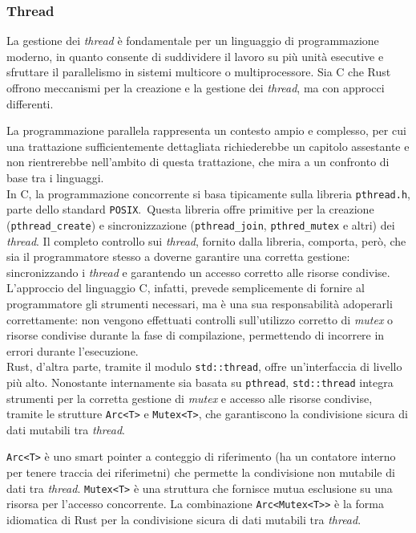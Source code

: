 \subsubsection{Thread}
La gestione dei \textit{thread} è fondamentale per un linguaggio di programmazione moderno, in quanto consente di suddividere il lavoro su più unità esecutive e sfruttare
il parallelismo in sistemi multicore o multiprocessore. 
Sia C che Rust
offrono meccanismi per la creazione e la gestione dei \textit{thread}, ma con approcci differenti. 

La programmazione parallela rappresenta un contesto ampio e complesso, per cui una 
trattazione sufficientemente dettagliata richiederebbe un capitolo assestante e non rientrerebbe nell'ambito di questa trattazione, che mira a un confronto di base tra i linguaggi. \hfill
\vspace{10pt}\\
\noindent In C, la programmazione concorrente si basa tipicamente sulla libreria \texttt{pthread.h}, parte dello standard \texttt{POSIX}.\ 
Questa libreria offre primitive per la creazione (\texttt{pthread\_create}) e sincronizzazione (\texttt{pthread\_join}, \texttt{pthred\_mutex} e altri) dei \textit{thread}.
Il completo controllo sui \textit{thread}, fornito dalla libreria, comporta, però, che sia il programmatore stesso a doverne garantire una corretta gestione: sincronizzando i \textit{thread} e
garantendo un accesso corretto alle risorse condivise. 
L'approccio del linguaggio C, infatti, prevede semplicemente di fornire al programmatore gli strumenti
necessari, ma è una sua responsabilità adoperarli correttamente: non vengono effettuati controlli sull'utilizzo corretto di \textit{mutex} o risorse condivise durante la fase 
di compilazione, permettendo di incorrere in errori durante l'esecuzione. \hfill
\vspace{10pt}\\
\noindent Rust, d'altra parte, tramite il modulo \texttt{std::thread}, offre un'interfaccia di livello più alto. 
Nonostante internamente sia basata su \texttt{pthread}, \texttt{std::thread} integra strumenti per la corretta gestione di \textit{mutex} e accesso alle risorse condivise, tramite
le strutture \texttt{Arc<T>} e \texttt{Mutex<T>}, che garantiscono la condivisione sicura di dati mutabili tra \textit{thread}.

\texttt{Arc<T>} è uno smart pointer a conteggio di riferimento (ha un contatore interno per tenere traccia dei riferimetni) che permette la condivisione non mutabile di dati tra \textit{thread}.
\texttt{Mutex<T>} è una struttura che fornisce mutua esclusione su una risorsa per l'accesso concorrente.
La combinazione \verb|Arc<Mutex<T>>| è la forma idiomatica di Rust per la condivisione sicura di dati mutabili tra \textit{thread}.

